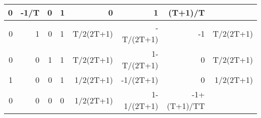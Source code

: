 \begin{table}[ht]
\begin{tabular}{rrrlrrrr}
    0      & -1/T       & 0  & 1  & 0         & 1          & (T+1)/T     &           \\ \hline
    0      & 1          & 0  & 1  & T/2(2T+1) & -T/(2T+1)  & -1          & T/2(2T+1) \\ \hline
    0      & 0          & 1  & 1  & T/2(2T+1) & 1-T/(2T+1) & 0           & T/2(2T+1) \\
    1      & 0          & 0  & 1  & 1/2(2T+1) & -1/(2T+1)  & 0           & 1/2(2T+1) \\ \hline
    0      & 0          & 0  & 0  & 1/2(2T+1) & 1-1/(2T+1) & -1+(T+1)/TT &           \\ \hline
  \end{tabular}
\end{table}

